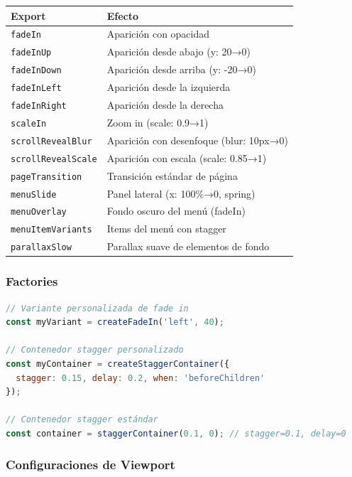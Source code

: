 \documentclass[12pt,a4paper]{article}
\begin{document}
\begin{table}[h]
\centering
\begin{tabular}{ll}
\toprule
\textbf{Export} & \textbf{Efecto} \\
\midrule
\texttt{fadeIn} & Aparición con opacidad \\
\texttt{fadeInUp} & Aparición desde abajo (y: 20→0) \\
\texttt{fadeInDown} & Aparición desde arriba (y: -20→0) \\
\texttt{fadeInLeft} & Aparición desde la izquierda \\
\texttt{fadeInRight} & Aparición desde la derecha \\
\texttt{scaleIn} & Zoom in (scale: 0.9→1) \\
\texttt{scrollRevealBlur} & Aparición con desenfoque (blur: 10px→0) \\
\texttt{scrollRevealScale} & Aparición con escala (scale: 0.85→1) \\
\texttt{pageTransition} & Transición estándar de página \\
\texttt{menuSlide} & Panel lateral (x: 100\%→0, spring) \\
\texttt{menuOverlay} & Fondo oscuro del menú (fadeIn) \\
\texttt{menuItemVariants} & Items del menú con stagger \\
\texttt{parallaxSlow} & Parallax suave de elementos de fondo \\
\bottomrule
\end{tabular}
\end{table}

\subsubsection{Factories}

\begin{lstlisting}[language=JavaScript]
// Variante personalizada de fade in
const myVariant = createFadeIn('left', 40);

// Contenedor stagger personalizado
const myContainer = createStaggerContainer({
  stagger: 0.15, delay: 0.2, when: 'beforeChildren'
});

// Contenedor stagger estándar
const container = staggerContainer(0.1, 0); // stagger=0.1, delay=0
\end{lstlisting}

\subsubsection{Configuraciones de Viewport}
\end{document}
